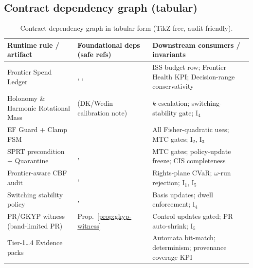 \subsection{Contract dependency graph (tabular)}\label{app:resolution-deps}
\emph{}
\begin{table}[h]
\centering
\renewcommand{\arraystretch}{1.12}
\begin{tabularx}{\textwidth}{@{}>{\raggedright\arraybackslash}p{3.7cm} >{\raggedright\arraybackslash}X >{\raggedright\arraybackslash}X@{}}
\toprule
\textbf{Runtime rule / artifact} & \textbf{Foundational deps (safe refs)} & \textbf{Downstream consumers / invariants} \\
\midrule
Frontier Spend Ledger &
\jsgiLem{\lblNoZeno}, \jsgiLem{\lblJacobiDefect}, \jsgiThm{\lblISS} &
ISS budget row; Frontier Health KPI; Decision-range conservativity \\
Holonomy \& Harmonic Rotational Mass &
\jsgiiSec{\lblSchemas} (DK/Wedin calibration note) &
$k$-escalation; switching-stability gate; I\(_4\) \\
EF Guard + Clamp FSM &
\jsgiiThm{\lblEFradius} &
All Fisher-quadratic uses; MTC gates; I\(_2\), I\(_3\) \\
SPRT precondition + Quarantine &
\jsgiiThm{\lblDROenv}, \jsgiiDef{\lblQuarantine} &
MTC gates; policy-update freeze; CIS completeness \\
Frontier-aware CBF audit &
\jsgiiLem{\lblSaltation}, \jsgiiLem{\lblCBFfrontier} &
Rights-plane CVaR; $\omega$-run rejection; I\(_1\), I\(_5\) \\
Switching stability policy &
\jsgiiLem{\lblGapGate}, \jsgiiThm{\lblSwitchStab} &
Basis updates; dwell enforcement; I\(_4\) \\
PR/GKYP witness (band-limited PR) &
Prop.~\ref{prop:gkyp-witness} &
Control updates gated; PR auto-shrink; I\(_5\) \\
Tier-1…4 Evidence packs &
\jsgiiSec{\lblSchemas} &
Automata bit-match; determinism; provenance coverage KPI \\
\bottomrule
\end{tabularx}
\caption{Contract dependency graph in tabular form (TikZ-free, audit-friendly).}
\label{tab:contract-deps}
\end{table}

